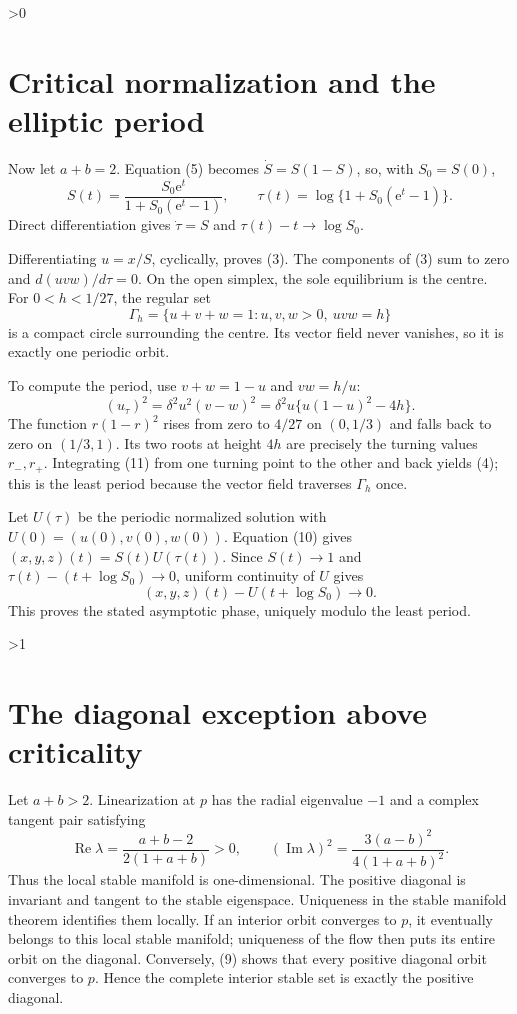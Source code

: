 \documentclass[10pt]{article}
\providecommand{\CRevisionRound}{2}
\theoremstyle{remark}
\newcommand{\e}{\mathrm e}
\begin{document}
\ifnum\CRevisionRound>0
\section{Critical normalization and the elliptic period}

Now let $a+b=2$.  Equation (5) becomes $\dot S=S(1-S)$, so, with $S_0=S(0)$,
\begin{equation}
 S(t)=\frac{S_0\e^t}{1+S_0(\e^t-1)},\qquad
 \tau(t)=\log\{1+S_0(\e^t-1)\}.
\end{equation}
Direct differentiation gives $\dot\tau=S$ and
$\tau(t)-t\to\log S_0$.

Differentiating $u=x/S$, cyclically, proves (3).  The components of (3) sum
to zero and $d(uvw)/d\tau=0$.  On the open simplex, the sole equilibrium is
the centre.  For $0<h<1/27$, the regular set
\[
 \Gamma_h=\{u+v+w=1: u,v,w>0,\ uvw=h\}
\]
is a compact circle surrounding the centre.  Its vector field never
vanishes, so it is exactly one periodic orbit.

To compute the period, use $v+w=1-u$ and $vw=h/u$:
\begin{equation}
 (u_\tau)^2=\delta^2u^2(v-w)^2
 =\delta^2u\{u(1-u)^2-4h\}.
\end{equation}
The function $r(1-r)^2$ rises from zero to $4/27$ on $(0,1/3)$ and falls
back to zero on $(1/3,1)$.  Its two roots at height $4h$ are precisely the
turning values $r_-,r_+$.  Integrating (11) from one turning point to the
other and back yields (4); this is the least period because the vector field
traverses $\Gamma_h$ once.

Let $U(\tau)$ be the periodic normalized solution with
$U(0)=(u(0),v(0),w(0))$.  Equation (10) gives
$(x,y,z)(t)=S(t)U(\tau(t))$.  Since $S(t)\to1$ and
$\tau(t)-(t+\log S_0)\to0$, uniform continuity of $U$ gives
\begin{equation}
 (x,y,z)(t)-U(t+\log S_0)\longrightarrow0.
\end{equation}
This proves the stated asymptotic phase, uniquely modulo the least period.
\fi

\ifnum\CRevisionRound>1
\section{The diagonal exception above criticality}

Let $a+b>2$.  Linearization at $p$ has the radial eigenvalue $-1$ and a
complex tangent pair satisfying
\begin{equation}
 \operatorname{Re}\lambda=\frac{a+b-2}{2(1+a+b)}>0,
 \qquad
 (\operatorname{Im}\lambda)^2=\frac{3(a-b)^2}{4(1+a+b)^2}.
\end{equation}
Thus the local stable manifold is one-dimensional.  The positive diagonal
is invariant and tangent to the stable eigenspace.  Uniqueness in the stable
manifold theorem identifies them locally.  If an interior orbit converges to
$p$, it eventually belongs to this local stable manifold; uniqueness of the
flow then puts its entire orbit on the diagonal.  Conversely, (9) shows that
every positive diagonal orbit converges to $p$.  Hence the complete interior
stable set is exactly the positive diagonal.
\end{document}
